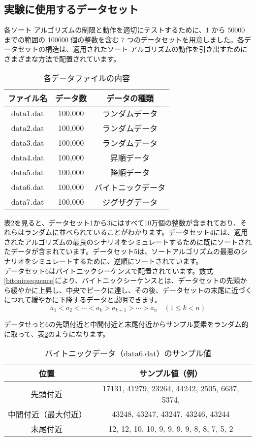 \documentclass[a4j, 12pt]{jarticle}
\begin{document}
\subsection{実験に使用するデータセット}
各ソート アルゴリズムの制限と動作を適切にテストするために、1 から 50000 までの範囲の 100000 個の整数を含む 7 つのデータセットを用意しました。各データセットの構造は、適用されたソート アルゴリズムの動作を引き出すためにさまざまな方法で配置されています。
\begin{table}[htbp]
  \centering
  \caption{各データファイルの内容}
  \begin{tabular}{|c|c|c|}
    \hline
    ファイル名 & データ数 & データの種類 \\
    \hline
    data1.dat & 100,000 & ランダムデータ \\
    data2.dat & 100,000 & ランダムデータ \\
    data3.dat & 100,000 & ランダムデータ \\
    data4.dat & 100,000 & 昇順データ \\
    data5.dat & 100,000 & 降順データ \\
    data6.dat & 100,000 & バイトニックデータ \\
    data7.dat & 100,000 & ジグザグデータ \\
    \hline
  \end{tabular}\label{tab:dataset-summary}
\end{table}
表2を見ると、データセット1から3にはすべて10万個の整数が含まれており、それらはランダムに並べられていることがわかります。データセット4には、適用されたアルゴリズムの最良のシナリオをシミュレートするために既にソートされたデータが含まれています。データセット5は、ソートアルゴリズムの最悪のシナリオをシミュレートするために、逆順にソートされています。\\

データセット6はバイトニックシーケンスで配置されています。数式\ref{bitonicsequence}により、バイトニックシーケンスとは、データセットの先頭から緩やかに上昇し、中央でピークに達し、その後、データセットの末尾に近づくにつれて緩やかに下降するデータと説明できます。\\
\begin{equation}\label{bitonicsequence}
a_1 < a_2 < \cdots < a_k > a_{k+1} > \cdots > a_n
\quad (1 \leq k < n)
\end{equation}

データせっと6の先頭付近と中間付近と末尾付近からサンプル要素をランダム的に取って、表\ref{tab:data6-sample}のようになります。
\begin{table}[H]
  \centering
  \caption{バイトニックデータ（data6.dat）のサンプル値}
  \begin{tabular}{|c|c|}
    \hline
    位置 & サンプル値（例） \\
    \hline
    先頭付近 & 17131, 41279, 23264, 44242, 2505, 6637, 5374,\\
    中間付近（最大付近） & 43248, 43247, 43247, 43246, 43244 \\
    末尾付近 & 12, 12, 10, 10, 9, 9, 9, 9, 8, 8, 7, 5, 2 \\
    \hline
  \end{tabular}\label{tab:data6-sample}
\end{table}
\end{document}
